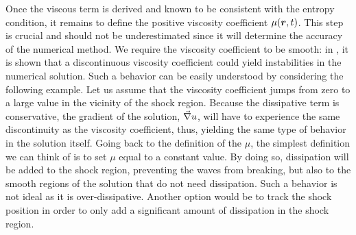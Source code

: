 Once the viscous term is derived and known to be consistent with the entropy condition, it remains to define the positive viscosity coefficient $\mu(\boldsymbol r,t)$. This step is crucial and should not be underestimated since it will determine the accuracy of the numerical method. We require the viscosity coefficient to be smooth: in \cite{REF},  it is shown that a discontinuous viscosity coefficient could yield instabilities in the numerical solution. Such a behavior can be easily understood by considering the following example. Let us assume that the viscosity coefficient jumps from zero to a large value in the vicinity of the shock region. Because the dissipative term is conservative, the gradient of the solution, $\vec{\nabla} u$, will have to experience the same discontinuity as the viscosity coefficient, thus, yielding the same type of behavior in the solution itself. Going back to the definition of the $\mu$, the simplest definition we can think of is to set $\mu$ equal to a constant value. By doing so, dissipation will be added to the shock region, preventing the waves from breaking, but also to the smooth regions of the solution that do not need dissipation. Such a behavior is not ideal as it is over-dissipative. Another option would be to track the shock position in order to only add a significant amount of dissipation in the shock region.    
